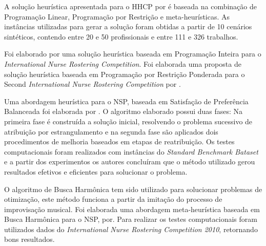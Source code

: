 A solução heurística apresentada para o \ac{HHCP} por \cite{Bertels:2006} é baseada na combinação de Programação Linear, Programação por Restrição e meta-heurísticas. As instâncias utilizadas para gerar a solução foram obtidas a partir de 10 cenários sintéticos, contendo entre 20 e 50 profissionais e entre 111 e 326 trabalhos.

Foi elaborado por \cite{gambini:2012} uma solução heurística baseada em Programação Inteira para o \textit{International Nurse Rostering Competition}.
Foi elaborada uma proposta de solução heurística baseada em Programação por Restrição Ponderada para o Second \textit{International Nurse Rostering Competition} por \cite{santos:2015}.


Uma abordagem heurística para o \ac{NSP}, baseada em Satisfação de Preferência Balanceada foi elaborada por \cite{constantino:2011}. O algoritmo elaborado possui duas fases: Na primeira fase é construída a solução inicial, resolvendo o problema sucessivo de atribuição por estrangulamento e na segunda fase são aplicados dois procedimentos de melhoria baseados em etapas de reatribuição. Os testes computacionais foram realizados com instâncias do \textit{Standard Benchmark Bataset} e a partir dos experimentos os autores concluíram que o método utilizado gerou resultados efetivos e eficientes para solucionar o problema.


O algoritmo de Busca Harmônica  tem sido utilizado para solucionar problemas de otimização, este método funciona a partir da imitação do processo de improvisação musical. Foi elaborada uma abordagem meta-heurística baseada em Busca Harmônica para o \ac{NSP}, por\cite{awadallah:2011}. Para realizar os testes computacionais foram utilizados dados do \textit{ International Nurse Rostering Competition 2010}, retornando bons resultados.

